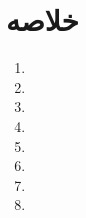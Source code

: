 \section{\textbf{خلاصه}}
\label{sec:3.6}
{
    \Large
    \begin{spacing}{1.5}
        \begin{enumerate}[label=\textbf{\arabic*}.]
            \item {}

            \item {}

            \item {}

            \item {}

            \item {}

            \item {}

            \item {}

            \item {}
        \end{enumerate}
    \end{spacing}
}
\newpage


